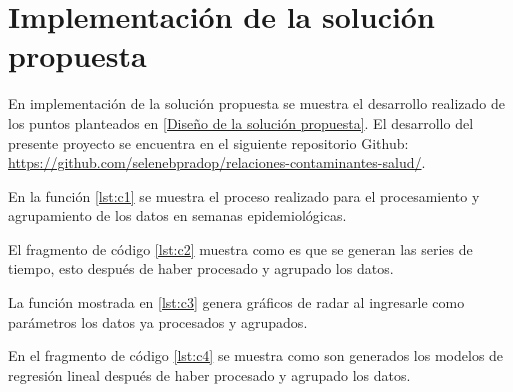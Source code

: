 \section{Implementación de la solución propuesta}
En implementación de la solución propuesta se muestra el desarrollo realizado de los puntos planteados en \ref{Diseño de la solución propuesta}. El desarrollo del presente proyecto se encuentra en el siguiente repositorio Github: \url{https://github.com/selenebpradop/relaciones-contaminantes-salud/}.

En la función \ref{lst:c1} se muestra el proceso realizado para el procesamiento y agrupamiento de los datos en semanas epidemiológicas.

El fragmento de código \ref{lst:c2} muestra como es que se generan las series de tiempo, esto después de haber procesado y agrupado los datos.

La función mostrada en \ref{lst:c3} genera gráficos de radar al ingresarle como parámetros los datos ya procesados y agrupados.

En el fragmento de código \ref{lst:c4} se muestra como son generados los modelos de regresión lineal después de haber procesado y agrupado los datos.
\clearpage

